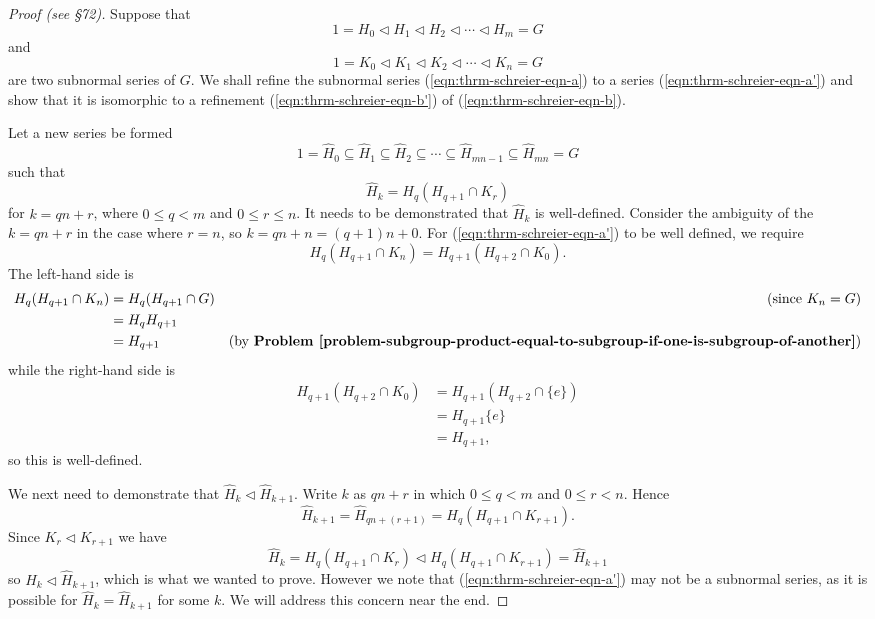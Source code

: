 \begin{proof}[Proof (see \cite{clark_1984} \S 72)]
    Suppose that
    \begin{equation}\label{eqn:thrm-schreier-eqn-a}
        1 = H_0 \lhd H_1 \lhd H_2 \lhd \cdots \lhd H_m = G    
        \tag{A}
    \end{equation}
    and
    \begin{equation}\label{eqn:thrm-schreier-eqn-b}
        1 = K_0 \lhd K_1 \lhd K_2 \lhd \cdots \lhd K_n = G    
        \tag{B}
    \end{equation}
    are two subnormal series of $G$. We shall refine the subnormal series (\ref{eqn:thrm-schreier-eqn-a}) to a series (\ref{eqn:thrm-schreier-eqn-a'}) and show that it is isomorphic to a refinement (\ref{eqn:thrm-schreier-eqn-b'}) of (\ref{eqn:thrm-schreier-eqn-b}).
    
    Let a new series be formed
    \begin{equation}\label{eqn:thrm-schreier-eqn-a'}
        1 = \hat{H}_0 \subseteq \hat{H}_1 \subseteq \hat{H}_2 \subseteq \cdots \subseteq \hat{H}_{mn - 1} \subseteq \hat{H}_{mn} = G
        \tag{A'}
    \end{equation}
    such that
    \[
        \hat{H}_k = H_q(H_{q+1}\cap K_r)
    \]
    for $k = qn + r$, where $0 \leq q < m$ and $0 \leq r \leq n$. It needs to be demonstrated that $\hat{H}_k$ is well-defined. Consider the ambiguity of the $k = qn + r$ in the case where $r = n$, so $k = qn + n = (q+1)n + 0$. For (\ref{eqn:thrm-schreier-eqn-a'}) to be well defined, we require
    \[
        H_q(H_{q+1} \cap K_n) = H_{q+1}(H_{q+2} \cap K_0).
    \]
    The left-hand side is
    \begin{align*}
        H_q(H_{q+1} \cap K_n) &= H_q(H_{q+1} \cap G) & \text{(since } K_n = G)\\
        &= H_qH_{q+1}\\
        &= H_{q+1} & \text{(by \textbf{Problem \ref{problem-subgroup-product-equal-to-subgroup-if-one-is-subgroup-of-another}})}
    \end{align*}
    while the right-hand side is
    \begin{align*}
        H_{q+1}(H_{q+2} \cap K_0) &= H_{q+1}(H_{q+2} \cap \{e\})\\
        &= H_{q+1}\{e\}\\
        &= H_{q+1},
    \end{align*}
    so this is well-defined.
    
    We next need to demonstrate that $\hat{H}_k \lhd \hat{H}_{k+1}$. Write $k$ as $qn+r$ in which $0 \leq q < m$ and $0 \leq r < n$. Hence
    \[
        \hat{H}_{k+1} = \hat{H}_{qn+(r+1)} = H_q(H_{q+1}\cap K_{r+1}). 
    \]
    Since $K_r \lhd K_{r+1}$ we have
    \[
        \hat{H}_k = H_q(H_{q+1}\cap K_r) \lhd H_q(H_{q+1}\cap K_{r+1}) = \hat{H}_{k+1}
    \]
    so $\hat{H}_k \lhd \hat{H}_{k+1}$, which is what we wanted to prove. However we note that (\ref{eqn:thrm-schreier-eqn-a'}) may not be a subnormal series, as it is possible for $\hat{H}_k = \hat{H}_{k+1}$ for some $k$. We will address this concern near the end.
    

\end{proof}
